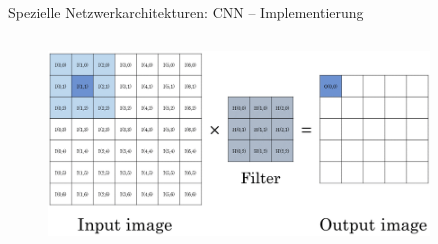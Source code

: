 \documentclass[aspectratio=1610, xcolor=dvipsnames, 9pt]{beamer}
\begin{document}
\begin{frame}{Spezielle Netzwerkarchitekturen: CNN -- Implementierung}
\begin{columns}
\begin{column}{0.4\textwidth}
\begin{figure}
                \centering
                            \includegraphics[width=0.9\textwidth]{images/convolution.png}
                \end{figure}
           \end{column}
        \end{columns}
      \end{frame}
\end{document}
